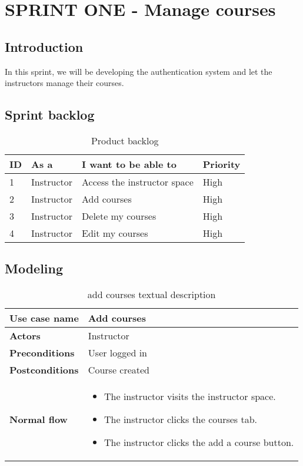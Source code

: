 \chapter{SPRINT ONE - Manage courses}
\newpage
\section*{Introduction}
In this sprint, we will be developing the authentication system and let the instructors manage their courses.
\section{Sprint backlog}
\begin{table}[H]
\centering
\caption{Product backlog}
\begin{tabular}{|p{1cm}|p{3cm}|p{6cm}|p{2cm}|}
\hline
\rowcolor{brown!18}\textbf{\large{ID}} & \textbf{\large{As a}} & \textbf{\large{I want to be able to}} & \textbf{\large{Priority}} \\
\hline
1& Instructor  & Access the instructor space & High\\\hline
2& Instructor & Add courses  & High\\\hline
3& Instructor & Delete my courses  & High\\\hline
4& Instructor & Edit my courses  & High\\\hline

\end{tabular}
\end{table}

\section{Modeling}

\begin{table}[H]
\centering
\caption{add courses textual description}
\begin{tabular}{|p{4cm}|p{10cm}|}
\hline
\textbf{\large{Use case name}} & Add courses \\\hline
\textbf{\large{Actors}} & Instructor \\\hline
\textbf{\large{Preconditions}} & User logged in \\\hline
\textbf{\large{Postconditions}} & Course created  \\\hline
\textbf{\large{Normal flow}} & 
\begin{itemize}
  \item The instructor visits the instructor space.
  \item The instructor clicks the courses tab.
  \item The instructor clicks the add a course button.
\end{itemize}
\\\hline

\end{tabular}
\end{table}

